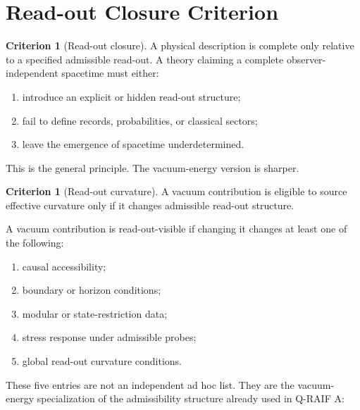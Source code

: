 \documentclass[12pt,a4paper]{article}
\theoremstyle{definition}
\newtheorem{criterion}[theorem]{Criterion}
\theoremstyle{remark}
\newcommand{\tightlist}{%
  \setlength{\itemsep}{0pt}\setlength{\parskip}{0pt}}
\begin{document}
\section{Read-out Closure Criterion}
\label{sec:criterion}

\begin{criterion}[Read-out closure]
A physical description is complete only relative to a specified admissible read-out. A theory claiming a complete observer-independent spacetime must either:
\begin{enumerate}[leftmargin=*]
\tightlist
\item introduce an explicit or hidden read-out structure;
\item fail to define records, probabilities, or classical sectors;
\item leave the emergence of spacetime underdetermined.
\end{enumerate}
\end{criterion}

This is the general principle. The vacuum-energy version is sharper.

\begin{criterion}[Read-out curvature]
A vacuum contribution is eligible to source effective curvature only if it changes admissible read-out structure.
\end{criterion}

A vacuum contribution is read-out-visible if changing it changes at least one of the following:

\begin{enumerate}[leftmargin=*]
\tightlist
\item causal accessibility;
\item boundary or horizon conditions;
\item modular or state-restriction data;
\item stress response under admissible probes;
\item global read-out curvature conditions.
\end{enumerate}

These five entries are not an independent ad hoc list. They are the vacuum-energy specialization of the admissibility structure already used in Q-RAIF A:
\end{document}
